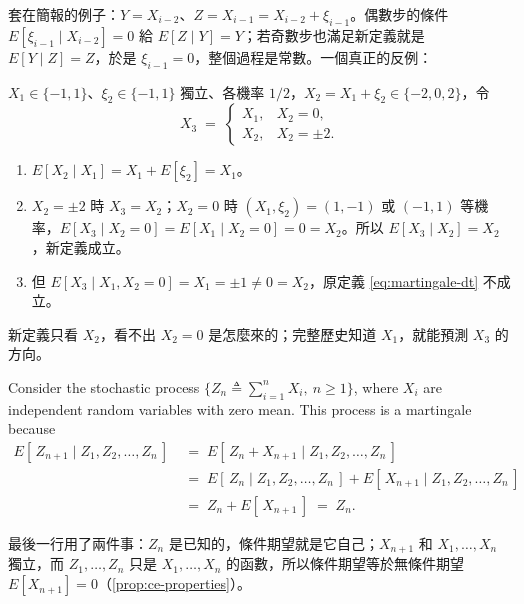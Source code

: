 套在簡報的例子：$Y=X_{i-2}$、$Z=X_{i-1}=X_{i-2}+\xi_{i-1}$。偶數步的條件 $E[\xi_{i-1}\mid X_{i-2}]=0$ 給 $E[Z\mid Y]=Y$；若奇數步也滿足新定義就是 $E[Y\mid Z]=Z$，於是 $\xi_{i-1}=0$，整個過程是常數。一個真正的反例：
\begin{eg}[補充]
	$X_{1}\in\{-1,1\}$、$\xi_{2}\in\{-1,1\}$ 獨立、各機率 $1/2$，$X_{2}=X_{1}+\xi_{2}\in\{-2,0,2\}$，令
	\[
		X_{3} \;=\;
		\begin{cases}
			X_{1} , & X_{2}=0 , \\
			X_{2} , & X_{2}=\pm2 .
		\end{cases}
	\]
	\begin{enumerate}[(1),nosep]
		\item $E[X_{2}\mid X_{1}]=X_{1}+E[\xi_{2}]=X_{1}$。
		\item $X_{2}=\pm2$ 時 $X_{3}=X_{2}$；$X_{2}=0$ 時 $(X_{1},\xi_{2})=(1,-1)$ 或 $(-1,1)$ 等機率，$E[X_{3}\mid X_{2}=0]=E[X_{1}\mid X_{2}=0]=0=X_{2}$。所以 $E[X_{3}\mid X_{2}]=X_{2}$，新定義成立。
		\item 但 $E[X_{3}\mid X_{1},X_{2}=0]=X_{1}=\pm1\ne0=X_{2}$，原定義 \eqref{eq:martingale-dt} 不成立。
	\end{enumerate}
\end{eg}

新定義只看 $X_{2}$，看不出 $X_{2}=0$ 是怎麼來的；完整歷史知道 $X_{1}$，就能預測 $X_{3}$ 的方向。
\suppend


\begin{eg}
	\label{eg:sum-martingale}
	Consider the stochastic process $\{Z_{n}\triangleq\sum_{i=1}^{n}X_{i},\ n\ge1\}$, where $X_{i}$ are independent random variables with zero mean.
	This process is a martingale because
	\begin{align*}
		E[\,Z_{n+1}\mid Z_{1},Z_{2},\dots,Z_{n}\,]
		& \;=\; E[\,Z_{n}+X_{n+1}\mid Z_{1},Z_{2},\dots,Z_{n}\,] \\
		& \;=\; E[\,Z_{n}\mid Z_{1},Z_{2},\dots,Z_{n}\,]+E[\,X_{n+1}\mid Z_{1},Z_{2},\dots,Z_{n}\,] \\
		& \;=\; Z_{n}+E[\,X_{n+1}\,] \;=\; Z_{n} .
	\end{align*}
\end{eg}

\suppstart
{}

\begin{remark}
	最後一行用了兩件事：$Z_{n}$ 是已知的，條件期望就是它自己；$X_{n+1}$ 和 $X_{1},\dots,X_{n}$ 獨立，而 $Z_{1},\dots,Z_{n}$ 只是 $X_{1},\dots,X_{n}$ 的函數，所以條件期望等於無條件期望 $E[X_{n+1}]=0$（\autoref{prop:ce-properties}）。
\end{remark}
\suppend

